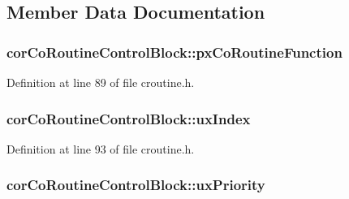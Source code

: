 \subsection{Member Data Documentation}
\subsubsection[{\texorpdfstring{px\+Co\+Routine\+Function}{pxCoRoutineFunction}}]{ cor\+Co\+Routine\+Control\+Block\+::px\+Co\+Routine\+Function}\hypertarget{structcor_co_routine_control_block_acc98c7364cd88e8e034a5f9bba113832}{}\label{structcor_co_routine_control_block_acc98c7364cd88e8e034a5f9bba113832}


Definition at line 89 of file croutine.\+h.

\subsubsection[{\texorpdfstring{ux\+Index}{uxIndex}}]{ cor\+Co\+Routine\+Control\+Block\+::ux\+Index}\hypertarget{structcor_co_routine_control_block_a6c185cd2145f562fb570bea9b158fc81}{}\label{structcor_co_routine_control_block_a6c185cd2145f562fb570bea9b158fc81}


Definition at line 93 of file croutine.\+h.

\subsubsection[{\texorpdfstring{ux\+Priority}{uxPriority}}]{ cor\+Co\+Routine\+Control\+Block\+::ux\+Priority}\hypertarget{structcor_co_routine_control_block_a752101a5d41b5caa7fd5149436613c8f}{}\label{structcor_co_routine_control_block_a752101a5d41b5caa7fd5149436613c8f}


